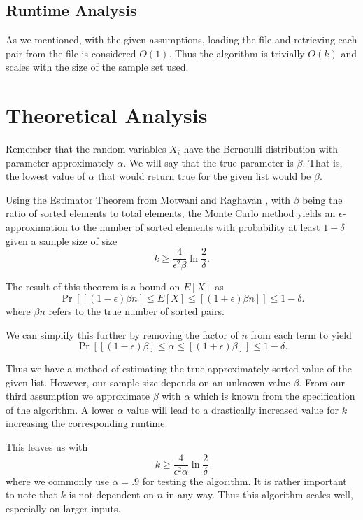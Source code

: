 \documentclass[11pt]{article}
\begin{document}
\subsection{Runtime Analysis}

As we mentioned, with the given assumptions, loading the file and retrieving each pair from the file is considered $O(1)$. Thus the algorithm is trivially $O(k)$ and scales with the size of the sample set used. 

\section{Theoretical Analysis}

Remember that the random variables $X_i$ have the Bernoulli distribution with parameter approximately $\alpha$. We will say that the true parameter is $\beta$. That is, the lowest value of $\alpha$ that would return true for the given list would be $\beta$. 

Using the Estimator Theorem from Motwani and Raghavan \cite{textbook}, with $\beta$ being the ratio of sorted elements to total elements, the Monte Carlo method yields an $\epsilon$-approximation to the number of sorted elements with probability at least $1-\delta$ given a sample size of size $$k \geq \frac{4}{\epsilon^2 \beta} \ln \frac{2}{\delta}.$$ 

The result of this theorem is a bound on $E[X]$ as $$\Pr\left[ [(1-\epsilon)\beta n] \leq E[X] \leq [(1+\epsilon)\beta n] \right] \leq 1 - \delta.$$ where $\beta n$ refers to the true number of sorted pairs. 

We can simplify this further by removing the factor of $n$ from each term to yield $$\Pr\left[ [(1-\epsilon)\beta] \leq \alpha \leq [(1+\epsilon)\beta] \right] \leq 1 - \delta.$$

Thus we have a method of estimating the true approximately sorted value of the given list. However, our sample size depends on an unknown value $\beta$. From our third assumption we approximate $\beta$ with $\alpha$ which is known from the specification of the algorithm. A lower $\alpha$ value will lead to a drastically increased value for $k$ increasing the corresponding runtime. 

This leaves us with $$k \geq \frac{4}{\epsilon^2 \alpha} \ln \frac{2}{\delta}$$ where we commonly use $\alpha = .9$ for testing the algorithm. It is rather important to note that $k$ is not dependent on $n$ in any way. Thus this algorithm scales well, especially on larger inputs.
\end{document}
